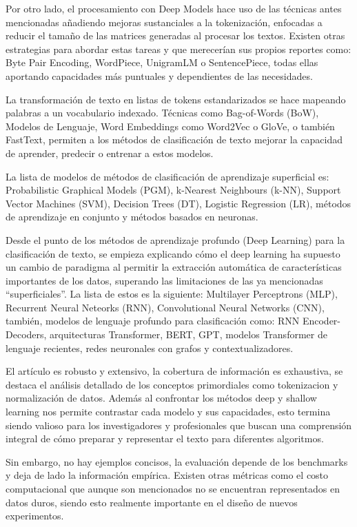 \documentclass[letterpaper,12pt]{article}
\begin{document}
Por otro lado, el procesamiento con Deep Models hace uso de las técnicas 
antes mencionadas añadiendo mejoras sustanciales a la tokenización, 
enfocadas a reducir el tamaño de las matrices generadas al procesar los
textos. Existen otras estrategias para abordar estas tareas y que merecerían
sus propios reportes como: Byte Pair Encoding, WordPiece, UnigramLM o 
SentencePiece, todas ellas aportando capacidades más puntuales y dependientes
de las necesidades.

La transformación de texto en listas de tokens estandarizados se hace mapeando
palabras a un vocabulario indexado. Técnicas como Bag-of-Words (BoW), Modelos
de Lenguaje, Word Embeddings como Word2Vec o GloVe, o también FastText, permiten a los métodos de clasificación de texto mejorar la capacidad de
aprender, predecir o entrenar a estos modelos.

La lista de modelos de métodos de clasificación de aprendizaje superficial 
es: Probabilistic Graphical Models (PGM), k-Nearest Neighbours (k-NN), 
Support Vector Machines (SVM), Decision Trees (DT), Logistic Regression (LR),
métodos de aprendizaje en conjunto y métodos basados en neuronas.

Desde el punto de los métodos de aprendizaje profundo (Deep Learning) para 
la clasificación de texto, se empieza explicando cómo el deep learning ha 
supuesto un cambio de paradigma al permitir la extracción automática de 
características importantes de los datos, superando las limitaciones de las
ya mencionadas ``superficiales''. La lista de estos es la siguiente: Multilayer 
Perceptrons (MLP), Recurrent Neural Neteorks (RNN), Convolutional Neural Networks
(CNN), también, modelos de lenguaje profundo para clasificación como: RNN 
Encoder-Decoders, arquitecturas Transformer, BERT, GPT, modelos Transformer de lenguaje
recientes, redes neuronales con grafos y contextualizadores.

El artículo es robusto y extensivo, la cobertura de información es exhaustiva,
se destaca el análisis detallado de los conceptos primordiales como tokenizacion
y normalización de datos. Además al confrontar los métodos deep y shallow learning
nos permite contrastar cada modelo y sus capacidades, esto termina siendo valioso
para los investigadores y profesionales que buscan una comprensión integral de cómo preparar y representar el texto 
para diferentes algoritmos.

Sin embargo, no hay ejemplos concisos, la evaluación depende de los benchmarks y
deja de lado la información empírica. Existen otras métricas como el costo computacional
que aunque son mencionados no se encuentran representados en datos duros, siendo esto 
realmente importante en el diseño de nuevos experimentos.




\end{document}
